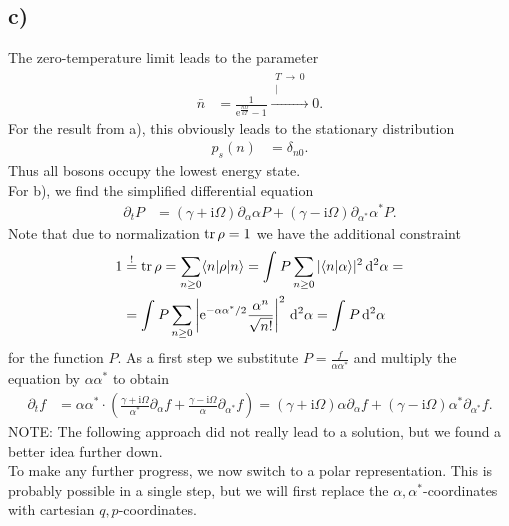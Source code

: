 \documentclass[english, parskip=full]{scrartcl}
\newcommand{\kom}{}
\newcommand{\brak}{}
\newcommand{\braket}{}
\newcommand{\intx}{}
\newcommand{\kla}{}
\newcommand{\tecxt}{}
\renewcommand{\i}{\text{i}}
\newcommand{\e}{\text{e}}
\begin{document}
\subsection*{c)}
The zero-temperature limit leads to the parameter
\begin{align}
\bar{n} &= \frac{1}{\e^{\frac{\hbar\Omega}{kT}} - 1} \kom\overset{\substack{{T\,\rightarrow\, 0} \\ |}}{\longrightarrow} 0.
\end{align}
For the result from a), this obviously leads to the stationary distribution
\begin{align}
p_s(n) &= \delta_{n0}.
\end{align}
Thus all bosons occupy the lowest energy state.\\
For b), we find the simplified differential equation
\begin{align}
\partial_tP &= (\gamma + \i\Omega) \partial_\alpha\alpha P + (\gamma - \i\Omega)\partial_{\alpha^\ast}\alpha^\ast P.
\end{align}
Note that due to normalization $\tecxt\text{tr\,}\rho = 1$ we have the additional constraint
\begin{align}
1 &\overset{!}{=} \tecxt\text{tr\,}\rho = \sum_{n\ge 0} \braket\langle n | \rho | n \rangle = \intx\int_{ }^{ } P\sum_{n\ge 0}|\brak\langle n | \alpha \rangle|^2 \, \mathrm{d}^2\alpha = \\
&= \intx\int_{ }^{ } P \sum_{n\ge 0} \left\vert \e^{-\alpha\alpha^\ast/2} \frac{\alpha^n}{\sqrt{n!}} \right\vert^2\, \mathrm{d}^2\alpha = \intx\int_{ }^{ } P \, \mathrm{d}^2\alpha
\end{align}
for the function $P$.
As a first step we substitute $P=\frac{f}{\alpha\alpha^\ast}$ and multiply the equation by $\alpha\alpha^\ast$ to obtain
\begin{align}
\partial_t f &= \alpha\alpha^\ast \cdot \kla\left( \frac{\gamma + \i\Omega}{\alpha^\ast}\partial_\alpha f + \frac{\gamma - \i\Omega}{\alpha}\partial_{\alpha^\ast} f \right) = (\gamma + \i\Omega)\alpha\partial_\alpha f + (\gamma - \i\Omega) \alpha^\ast\partial_{\alpha^\ast} f.
\end{align}
NOTE: The following approach did not really lead to a solution, but we found a better idea further down.\\
To make any further progress, we now switch to a polar representation.
This is probably possible in a single step, but we will first replace the $\alpha,\alpha^\ast$-coordinates with cartesian $q,p$-coordinates.
\end{document}
